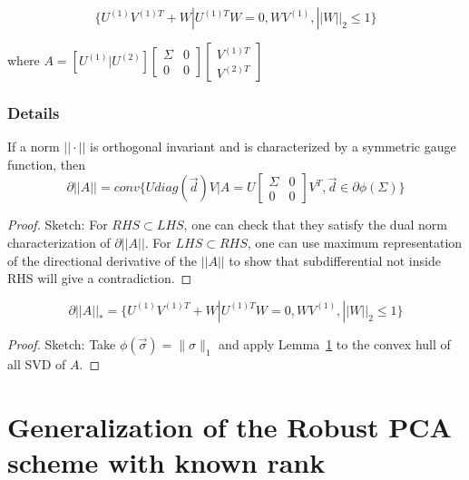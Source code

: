 \documentclass{../common/projectreport}
\begin{document}
\[
\{U^{(1)}V^{(1)T}+W|U^{(1)T}W=0,WV^{(1)},||W||_{2}\le1\}
\]


where $A=[U^{(1)}|U^{(2)}]
[
\begin{array}{cc}
\Sigma & 0\\
0 & 0
\end{array}
]
[
\begin{array}{c}
V^{(1)T}\\
V^{(2)T}
\end{array}
]
$


\subsubsection{Details}

\begin{lemma}
If a norm $||\cdot||$ is orthogonal invariant and is characterized by a symmetric gauge function, then
\textup{
\[
\partial||A||=conv\{Udiag(\vec{d})V|A=U[\begin{array}{cc}
\Sigma & 0\\
0 & 0
\end{array}]V^{T},\vec{d}\in\partial\phi(\Sigma)\}
\]
}
\end{lemma}

\begin{proof}
Sketch: For $RHS\subset LHS$, one can check that they satisfy the dual norm characterization of $\partial||A||$. For $LHS\subset RHS$, one can use maximum representation of the directional derivative of
the $||A||$ to show that subdifferential not inside RHS will give
a contradiction. 
\end{proof}

\begin{prop}
\[
\partial||A||_{*}=\{U^{(1)}V^{(1)T}+W|U^{(1)T}W=0,WV^{(1)},||W||_{2}\le1\}
\]
\end{prop}

\begin{proof}
Sketch: Take $\phi(\vec{\sigma}) =  \|\sigma \|_1$ and apply Lemma~\ref{} to the convex hull of all SVD of $A$.
\end{proof}



\section{Generalization of the Robust PCA scheme with known rank}
\end{document}
